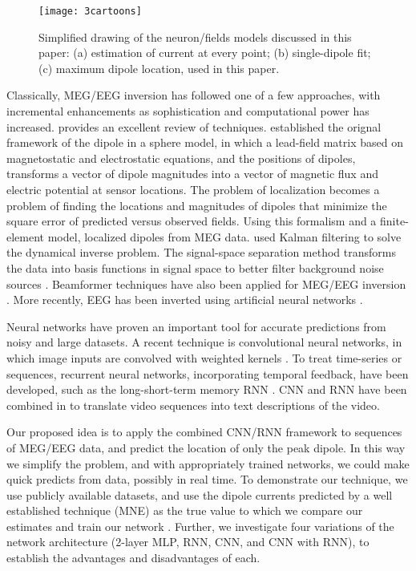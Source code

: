 \documentclass[journal]{IEEEtran}
\begin{document}
\begin{figure}[h!]
\centering
\texttt{[image: 3cartoons]}
\caption{Simplified drawing of the neuron/fields models discussed in this paper: (a) estimation of current at every point; (b) single-dipole fit; (c) maximum dipole location,  used in this paper.}
\label{fig:cartoon}
\end{figure}

Classically, MEG/EEG inversion has followed one of a few approaches, with incremental enhancements as sophistication and computational power has increased. \cite{grech2008review} provides an excellent review of techniques. \cite{mosher1992multiple} established the orignal framework of the dipole in a sphere model, in which a lead-field matrix based on magnetostatic and electrostatic equations, and the positions of dipoles, transforms a vector of dipole magnitudes into a vector of magnetic flux and electric potential at sensor locations. The problem of localization becomes a problem of finding the locations and magnitudes of dipoles that minimize the square error of predicted versus observed fields. Using this formalism and a finite-element model, \cite{buchner1997inverse} localized dipoles from MEG data. \cite{galka2004solution} used Kalman filtering to solve the dynamical inverse problem. The signal-space separation method transforms the data into basis functions in signal space to better filter background noise sources \cite{taulu2005applications}. Beamformer techniques have also been applied for MEG/EEG inversion \cite{sekihara2001reconstructing}. More recently, EEG has been inverted using artificial neural networks \cite{van2000eeg}.


Neural networks have proven an important tool for accurate predictions from noisy and large datasets. A recent technique is convolutional neural networks, in which image inputs are convolved with weighted kernels \cite{lecun1998gradient}. To treat time-series or sequences, recurrent neural networks, incorporating temporal feedback, have been developed, such as the long-short-term memory RNN \cite{hochreiter1997long}. CNN and RNN have been combined in \cite{venugopalan2014translating} to translate video sequences into text descriptions of the video.


Our proposed idea is to apply the combined CNN/RNN framework to sequences of MEG/EEG data, and predict the location of only the peak dipole. In this way we simplify the problem, and with appropriately trained networks, we could make quick predicts from data, possibly in real time. To demonstrate our technique, we use publicly available datasets, and use the dipole currents predicted by a well established technique (MNE) as the true value to which we compare our estimates and train our network \cite{gramfort2014mne}. Further, we investigate four variations of the network architecture (2-layer MLP, RNN, CNN, and CNN with RNN), to establish the advantages and disadvantages of each.
\end{document}
